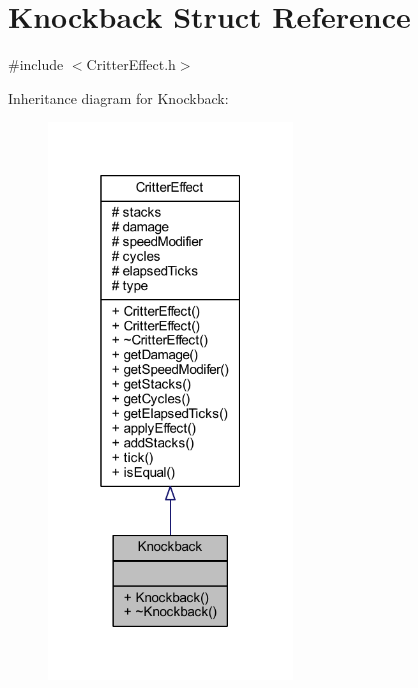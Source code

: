 \hypertarget{struct_knockback}{\section{Knockback Struct Reference}
\label{struct_knockback}
}


{\ttfamily \#include $<$Critter\+Effect.\+h$>$}



Inheritance diagram for Knockback\+:\nopagebreak
\begin{figure}[H]
\begin{center}
\leavevmode
\includegraphics[width=184pt]{struct_knockback__inherit__graph}
\end{center}
\end{figure}


